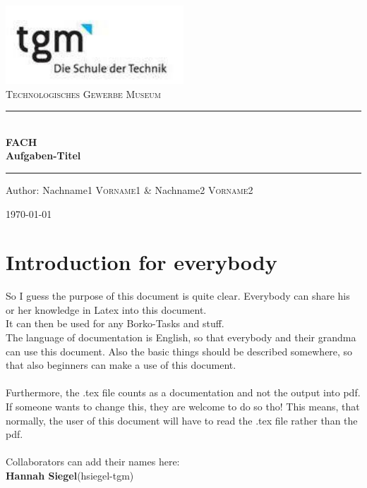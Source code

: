 \documentclass[12pt]{article}
\begin{document}
\begin{titlepage}
\begin{center}
\includegraphics[width=0.5\textwidth]{images/logo}\\[1cm]    

\textsc{\LARGE Technologisches Gewerbe Museum}\\[1.5cm]

\rule{12cm}{1mm}
{ \huge \bfseries  \\\large FACH\\ \huge Aufgaben-Titel \\[0.4cm] }

\rule{12cm}{1mm}

\noindent 
\vspace{5cm}

\begin{center}
\large
Author: 
Nachname1 \textsc{Vorname1} \&
Nachname2 \textsc{Vorname2}
\end{center}

\vfill

{\large \today}

\end{center}
\end{titlepage}

\tableofcontents


\ohead{\headmark}

\newpage
\section{Introduction for everybody}
So I guess the purpose of this document is quite clear. Everybody can share his or her knowledge in Latex into this document. \\
It can then be used for any Borko-Tasks and stuff. \\
The language of documentation is English, so that everybody and their grandma can use this document.
Also the basic things should be described somewhere, so that also beginners can make a use of this document. \\ \\
Furthermore, the .tex file counts as a documentation and not the output into pdf. If someone wants to change this, they are welcome to do so tho! This means, that normally, the user of this document will have to read the .tex file rather than the pdf. \\ \\
Collaborators can add their names here: \\
\textbf{Hannah Siegel}(hsiegel-tgm) \\
\newpage
\end{document}
